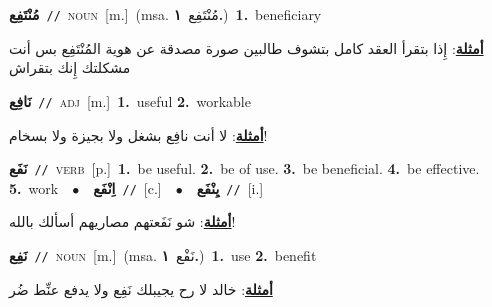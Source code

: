 \documentclass[10pt,a4paper,twoside]{article} %
\begin{document}
\begin{multicols}{2}
{\setlength\topsep{0pt}\textbf{\foreignlanguage{arabic}{مُنْتَفِع}}\ {\color{gray}\texttt{//}\color{black}}\ \textsc{noun}\ [m.]\ \color{gray}(msa. \foreignlanguage{arabic}{مُنْتَفِع}~\foreignlanguage{arabic}{\textbf{١.}})\color{black}\ \textbf{1.}~beneficiary\  \begin{flushright}\color{gray}\foreignlanguage{arabic}{\textbf{\underline{\foreignlanguage{arabic}{أمثلة}}}: إِذا بتقرأ العقد كامل بتشوف طالبين صورة مصدقة عن هوية المُنْتَفِع بس أنت مشكلتك إِنك بتقراش}\end{flushright}\color{black}} \vspace{2mm}

{\setlength\topsep{0pt}\textbf{\foreignlanguage{arabic}{نَافِع}}\ {\color{gray}\texttt{//}\color{black}}\ \textsc{adj}\ [m.]\ \textbf{1.}~useful  \textbf{2.}~workable\  \begin{flushright}\color{gray}\foreignlanguage{arabic}{\textbf{\underline{\foreignlanguage{arabic}{أمثلة}}}: لا أنت نافِع بشغل ولا بجيزة ولا بسخام!}\end{flushright}\color{black}} \vspace{2mm}

{\setlength\topsep{0pt}\textbf{\foreignlanguage{arabic}{نَفَع}}\ {\color{gray}\texttt{//}\color{black}}\ \textsc{verb}\ [p.]\ \textbf{1.}~be useful.  \textbf{2.}~be of use.  \textbf{3.}~be beneficial.  \textbf{4.}~be effective.  \textbf{5.}~work\ \ $\bullet$\ \ \setlength\topsep{0pt}\textbf{\foreignlanguage{arabic}{اِنْفَع}}\ {\color{gray}\texttt{//}\color{black}}\ [c.]\ \ $\bullet$\ \ \setlength\topsep{0pt}\textbf{\foreignlanguage{arabic}{يِنْفَع}}\ {\color{gray}\texttt{//}\color{black}}\ [i.]\  \begin{flushright}\color{gray}\foreignlanguage{arabic}{\textbf{\underline{\foreignlanguage{arabic}{أمثلة}}}: شو نَفَعتهم مصاريهم أسألك بالله!}\end{flushright}\color{black}} \vspace{2mm}

{\setlength\topsep{0pt}\textbf{\foreignlanguage{arabic}{نَفِع}}\ {\color{gray}\texttt{//}\color{black}}\ \textsc{noun}\ [m.]\ \color{gray}(msa. \foreignlanguage{arabic}{نَفْع}~\foreignlanguage{arabic}{\textbf{١.}})\color{black}\ \textbf{1.}~use  \textbf{2.}~benefit\  \begin{flushright}\color{gray}\foreignlanguage{arabic}{\textbf{\underline{\foreignlanguage{arabic}{أمثلة}}}: خالد لا رح يجيبلك نَفِع ولا يدفع عنِّط ضُر}\end{flushright}\color{black}} \vspace{2mm}


\end{multicols}
\end{document}
